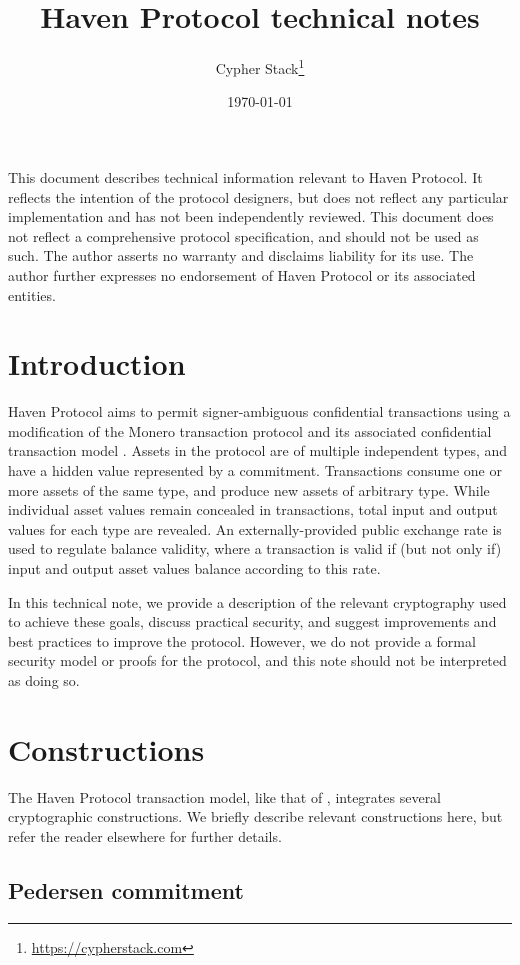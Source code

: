 \documentclass{article}
\title{Haven Protocol technical notes}
\author{Cypher Stack\thanks{\url{https://cypherstack.com}}}
\date{\today}
\begin{document}
\maketitle


This document describes technical information relevant to Haven Protocol.
It reflects the intention of the protocol designers, but does not reflect any particular implementation and has not been independently reviewed.
This document does not reflect a comprehensive protocol specification, and should not be used as such.
The author asserts no warranty and disclaims liability for its use.
The author further expresses no endorsement of Haven Protocol or its associated entities.


\section{Introduction}

Haven Protocol aims to permit signer-ambiguous confidential transactions using a modification of the Monero transaction protocol and its associated confidential transaction model \cite{ringct}.
Assets in the protocol are of multiple independent types, and have a hidden value represented by a commitment.
Transactions consume one or more assets of the same type, and produce new assets of arbitrary type.
While individual asset values remain concealed in transactions, total input and output values for each type are revealed.
An externally-provided public exchange rate is used to regulate balance validity, where a transaction is valid if (but not only if) input and output asset values balance according to this rate.

In this technical note, we provide a description of the relevant cryptography used to achieve these goals, discuss practical security, and suggest improvements and best practices to improve the protocol.
However, we do not provide a formal security model or proofs for the protocol, and this note should not be interpreted as doing so.


\section{Constructions}

The Haven Protocol transaction model, like that of \cite{ringct}, integrates several cryptographic constructions.
We briefly describe relevant constructions here, but refer the reader elsewhere for further details.

\subsection{Pedersen commitment}
\end{document}
